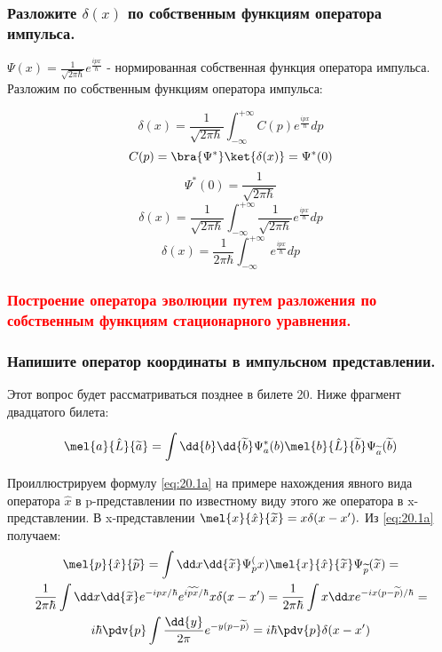 \subsubsection{Разложите $\delta(x)$  по собственным функциям оператора импульса.}


$\Psi(x)=\frac{1}{\sqrt{2\pi \hbar}}e^{\frac{ip x}{\hbar}}$ - нормированная собственная функция оператора импульса. Разложим по собственным функциям оператора импульса:

$$\delta(x) = \frac{1}{\sqrt{2\pi \hbar}}\int_{-\infty}^{+\infty} C(p) e^{\frac{ip x}{\hbar}} dp$$
$$C(p)=\bra{\Psi^*} \ket{\delta(x)}=\Psi^*(0)$$
$$\Psi^*(0)=\frac{1}{\sqrt{2\pi \hbar}}$$
$$\delta(x) = \frac{1}{\sqrt{2\pi \hbar}}\int_{-\infty}^{+\infty} \frac{1}{\sqrt{2\pi \hbar}} e^{\frac{ip x}{\hbar}} dp$$
$$\delta(x) = \frac{1}{2\pi \hbar}\int_{-\infty}^{+\infty} \ e^{\frac{ip x}{\hbar}} dp$$

\subsubsection{\textcolor{red} {Построение оператора эволюции путем разложения по собственным функциям стационарного уравнения.} }

\subsubsection{{Напишите оператор координаты в импульсном представлении.} }

Этот вопрос будет рассматриваться позднее в билете 20. Ниже фрагмент двадцатого билета:

\begin{equation}
	\label{eq:20.1a}
	\mel{a}{\hat{L}}{\tilde a}=\int \dd{b}\dd{\tilde b} \Psi_a^*(b)\mel{b}{\hat L}{\tilde b} \Psi_{\tilde a}(\tilde b)
\end{equation}

Проиллюстрируем формулу \eqref{eq:20.1a} на примере нахождения явного вида оператора $\hat x$ в p-представлении по известному виду этого же оператора в x-представлении. В x-представлении $\mel{x}{\hat x}{\tilde x}=x\delta(x-x').$ Из \eqref{eq:20.1a} получаем:
\begin{gather*}
	\mel{p}{\hat x}{\tilde p}=\int \dd x \dd{\tilde x} \Psi_p^(x)\mel{x}{\hat x }{\tilde x}\Psi_{\tilde p}(\tilde x)=
	\\
	\frac{1}{2\pi\hbar}\int \dd x \dd{\tilde x} e^{-ipx/\hbar}e^{i\tilde p \tilde x/\hbar}x \delta(x-x')=\frac{1}{2\pi\hbar}\int x\dd x e^{-ix(p-\tilde p)/\hbar}=\\
	i\hbar\pdv{p}\int \frac{\dd{y}}{2\pi}e^{-y(p-\tilde p)}=i\hbar\pdv{p} \delta(x-x')
\end{gather*}